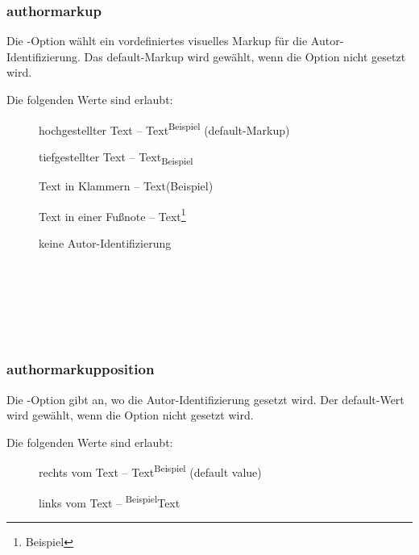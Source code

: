 \subsubsection{authormarkup}

Die -Option wählt ein vordefiniertes visuelles Markup für die Autor-Identifizierung.
Das default-Markup wird gewählt, wenn die Option nicht gesetzt wird.

Die folgenden Werte sind erlaubt:
\begin{description}
	\item [] hochgestellter Text -- Text\textsuperscript{Beispiel} (default-Markup)
	\item [] tiefgestellter Text -- Text\textsubscript{Beispiel}
	\item [] Text in Klammern -- Text(Beispiel)
	\item [] Text in einer Fußnote -- Text\footnote{Beispiel}
	\item [] keine Autor-Identifizierung
\end{description}

\begin{chusage}
		\>\\
	\usageexample
		\> \Corresponds\ \\
		\>\\
		\>\\
		\>\\
		\>
\end{chusage}



\subsubsection{authormarkupposition}

Die -Option gibt an, wo die Autor-Identifizierung gesetzt wird.
Der default-Wert wird gewählt, wenn die Option nicht gesetzt wird.

Die folgenden Werte sind erlaubt:
\begin{description}
	\item [] rechts vom Text -- Text\textsuperscript{Beispiel} (default value)
	\item [] links vom Text -- \textsuperscript{Beispiel}Text
\end{description}

